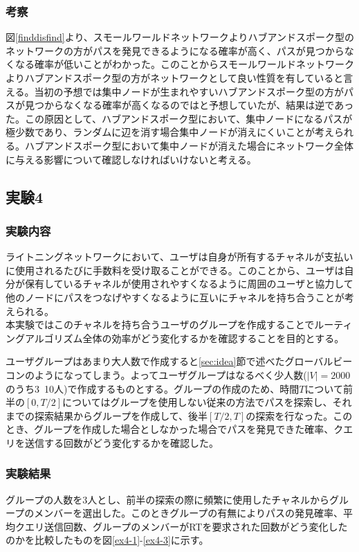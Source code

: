 \documentclass[12pt]{jarticle}
\begin{document}
\subsubsection{考察}
図\ref{finddisfind}より、スモールワールドネットワークよりハブアンドスポーク型のネットワークの方がパスを発見できるようになる確率が高く、パスが見つからなくなる確率が低いことがわかった。このことからスモールワールドネットワークよりハブアンドスポーク型の方がネットワークとして良い性質を有していると言える。当初の予想では集中ノードが生まれやすいハブアンドスポーク型の方がパスが見つからなくなる確率が高くなるのではと予想していたが、結果は逆であった。この原因として、ハブアンドスポーク型において、集中ノードになるパスが極少数であり、ランダムに辺を消す場合集中ノードが消えにくいことが考えられる。ハブアンドスポーク型において集中ノードが消えた場合にネットワーク全体に与える影響について確認しなければいけないと考える。

\subsection{実験4}
\subsubsection{実験内容}
ライトニングネットワークにおいて、ユーザは自身が所有するチャネルが支払いに使用されるたびに手数料を受け取ることができる。このことから、ユーザは自分が保有しているチャネルが使用されやすくなるように周囲のユーザと協力して他のノードにパスをつなげやすくなるように互いにチャネルを持ち合うことが考えられる。
\\
本実験ではこのチャネルを持ち合うユーザのグループを作成することでルーティングアルゴリズム全体の効率がどう変化するかを確認することを目的とする。
\par
ユーザグループはあまり大人数で作成すると\ref{sec:idea}節で述べたグローバルビーコンのようになってしまう。よってユーザグループはなるべく少人数($|V|=2000$のうち3~10人)で作成するものとする。グループの作成のため、時間$T$について前半の$[0,T/2]$についてはグループを使用しない従来の方法でパスを探索し、それまでの探索結果からグループを作成して、後半$[T/2,T]$の探索を行なった。このとき、グループを作成した場合としなかった場合でパスを発見できた確率、クエリを送信する回数がどう変化するかを確認した。

\subsubsection{実験結果}
グループの人数を3人とし、前半の探索の際に頻繁に使用したチャネルからグループのメンバーを選出した。このときグループの有無によりパスの発見確率、平均クエリ送信回数、グループのメンバーがRTを要求された回数がどう変化したのかを比較したものを図\ref{ex4-1}-\ref{ex4-3}に示す。
\end{document}
